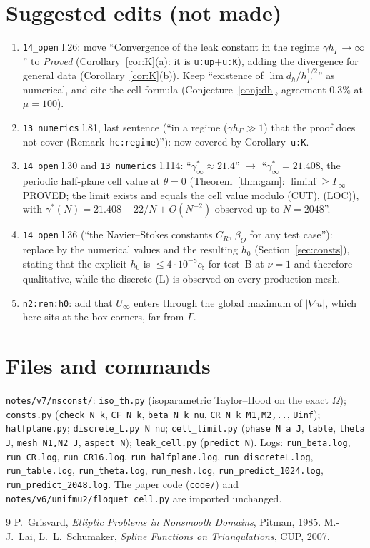 \documentclass[11pt]{article}
\theoremstyle{definition}
\theoremstyle{remark}
\newcommand{\hG}{h_\Gamma}
\begin{document}
\section{Suggested edits (not made)}
\begin{enumerate}
\item \texttt{14\_open} l.26: move ``Convergence of the leak constant in the regime $\gamma\hG\to\infty$'' to \emph{Proved} (Corollary~\ref{cor:K}(a): it is \texttt{u:up}+\texttt{u:K}), adding the divergence for general data (Corollary~\ref{cor:K}(b)). Keep ``existence of $\lim d_h/\hG^{1/2}$'' as numerical, and cite the cell formula (Conjecture~\ref{conj:dh}, agreement $0.3\%$ at $\mu=100$).
\item \texttt{13\_numerics} l.81, last sentence (``in a regime ($\gamma\hG\gg1$) that the proof does not cover (Remark~\texttt{hc:regime})''): now covered by Corollary~\texttt{u:K}.
\item \texttt{14\_open} l.30 and \texttt{13\_numerics} l.114: ``$\gamma^\ast_\infty\approx21.4$'' $\to$ ``$\gamma^\ast_\infty=21.408$, the periodic half-plane cell value at $\theta=0$ (Theorem~\ref{thm:gam}: $\liminf\ge\Gamma_\infty$ PROVED; the limit exists and equals the cell value modulo (CUT), (LOC)), with $\gamma^\ast(N)=21.408-22/N+O(N^{-2})$ observed up to $N=2048$''.
\item \texttt{14\_open} l.36 (``the Navier--Stokes constants $C_R$, $\beta_O$ for any test case''): replace by the numerical values and the resulting $h_0$ (Section~\ref{sec:consts}), stating that the explicit $h_0$ is $\le4\cdot10^{-8}c_\natural$ for test~B at $\nu=1$ and therefore qualitative, while the discrete (L) is observed on every production mesh.
\item \texttt{n2:rem:h0}: add that $U_\infty$ enters through the global maximum of $|\nabla u|$, which here sits at the box corners, far from $\Gamma$.
\end{enumerate}

\section{Files and commands}\label{sec:files}
\texttt{notes/v7/nsconst/}: \texttt{iso\_th.py} (isoparametric Taylor--Hood on the exact $\Omega$); \texttt{consts.py} (\texttt{check N k}, \texttt{CF N k}, \texttt{beta N k nu}, \texttt{CR N k M1,M2,..}, \texttt{Uinf}); \texttt{halfplane.py}; \texttt{discrete\_L.py N nu}; \texttt{cell\_limit.py} (\texttt{phase N a J}, \texttt{table}, \texttt{theta J}, \texttt{mesh N1,N2 J}, \texttt{aspect N}); \texttt{leak\_cell.py} (\texttt{predict N}). Logs: \texttt{run\_beta.log}, \texttt{run\_CR.log}, \texttt{run\_CR16.log}, \texttt{run\_halfplane.log}, \texttt{run\_discreteL.log}, \texttt{run\_table.log}, \texttt{run\_theta.log}, \texttt{run\_mesh.log}, \texttt{run\_predict\_1024.log}, \texttt{run\_predict\_2048.log}. The paper code (\texttt{code/}) and \texttt{notes/v6/unifmu2/floquet\_cell.py} are imported unchanged.

\begin{thebibliography}{9}
 P.~Grisvard, \emph{Elliptic Problems in Nonsmooth Domains}, Pitman, 1985.
 M.-J.~Lai, L.~L.~Schumaker, \emph{Spline Functions on Triangulations}, CUP, 2007.
\end{thebibliography}
\end{document}
